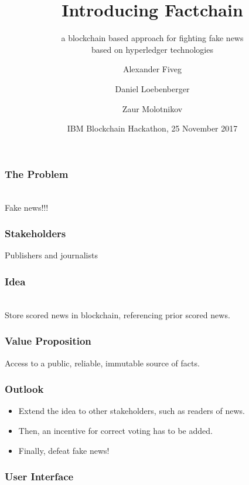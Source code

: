 \documentclass[aspectratio=169]{beamer}
\title{Introducing Factchain}
\subtitle{a blockchain based approach for fighting fake news\\based on hyperledger technologies}
\author{Alexander Fiveg \and Daniel Loebenberger \and Zaur Molotnikov}
\institute{\texttt{\{afiveg,dloeb,zmolo\}@genua.de}}
\date{IBM Blockchain Hackathon, 25 November 2017}
\begin{document}
\frame[plain]{\titlepage}

\begin{frame}
\frametitle{The Problem}

\begin{center}
\\
Fake news!!!
\end{center}
\end{frame}

\begin{frame}
\frametitle{Stakeholders}

\begin{center}

Publishers and journalists
\end{center}
\end{frame}

\begin{frame}
\frametitle{Idea}

\begin{center}
\\[1em]

Store scored news in blockchain, referencing prior scored news.
\end{center}
\end{frame}

\begin{frame}
\frametitle{Value Proposition}

\begin{center}

Access to a public, reliable, immutable source of facts.
\end{center}
\end{frame}

\begin{frame}
\frametitle{Outlook}

\begin{minipage}[6cm]{7.5cm}
\begin{itemize}
\item Extend the idea to other stakeholders, such as readers of news.
\item Then, an incentive for correct voting has to be added.
\item Finally, defeat fake news!
\end{itemize}
\end{minipage}
\hfill
\begin{minipage}[5cm]{6cm}
\end{minipage}
\end{frame}

\begin{frame}
\frametitle{User Interface}

\begin{center}
\end{center}
\end{frame}
\end{document}

